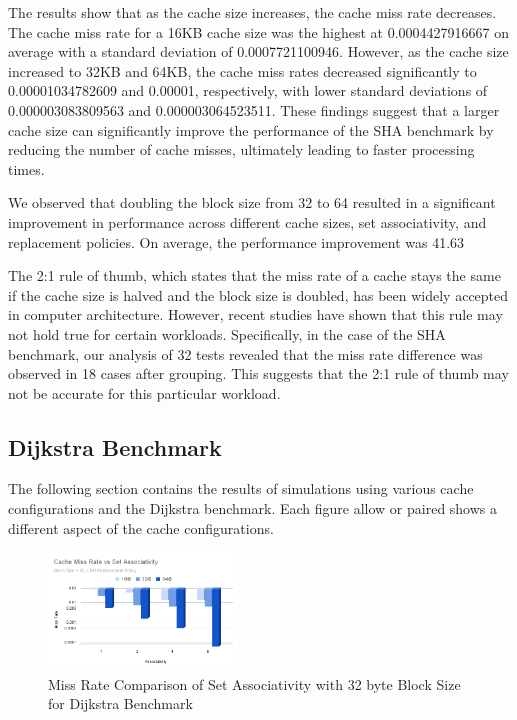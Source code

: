 \documentclass[conference]{IEEEtran}
\begin{document}
The results show that as the cache size increases, the cache miss rate decreases. The cache miss rate for a 16KB cache size was the highest at 0.0004427916667 on average with a standard deviation of 0.0007721100946. However, as the cache size increased to 32KB and 64KB, the cache miss rates decreased significantly to 0.00001034782609 and 0.00001, respectively, with lower standard deviations of 0.000003083809563 and 0.000003064523511. These findings suggest that a larger cache size can significantly improve the performance of the SHA benchmark by reducing the number of cache misses, ultimately leading to faster processing times.

\space


We observed that doubling the block size from 32 to 64 resulted in a significant improvement in performance across different cache sizes, set associativity, and replacement policies. On average, the performance improvement was 41.63%

The 2:1 rule of thumb, which states that the miss rate of a cache stays the same if the cache size is halved and the block size is doubled, has been widely accepted in computer architecture. However, recent studies have shown that this rule may not hold true for certain workloads. Specifically, in the case of the SHA benchmark, our analysis of 32 tests revealed that the miss rate difference was observed in 18 cases after grouping. This suggests that the 2:1 rule of thumb may not be accurate for this particular workload.


\subsection{Dijkstra Benchmark}

The following section contains the results of simulations using various cache configurations and the Dijkstra benchmark. Each figure allow or paired shows a different aspect of the cache configurations.

\begin{figure}[H]
  \centering
  \includegraphics[width=0.45\textwidth]{dijkstraFigures/CacheMissRateVsSetAssociativity32.png}
  \caption{Miss Rate Comparison of Set Associativity with 32 byte Block Size for Dijkstra Benchmark}
  \label{fig:MissRateVsSetAssoc32}
\end{figure}
\end{document}
